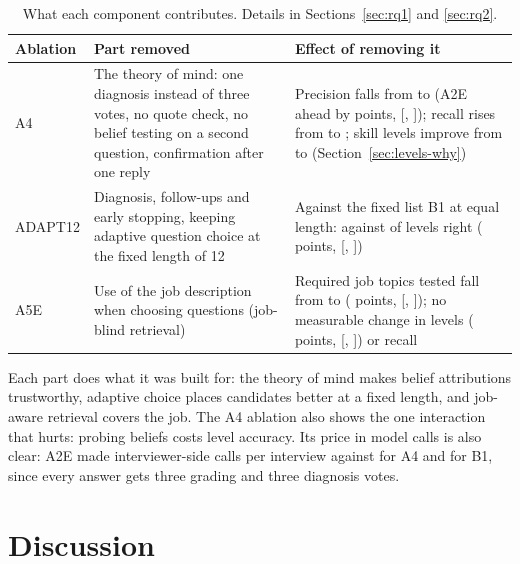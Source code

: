 \documentclass[10pt,a4paper]{article}
\newcommand{\ci}[2]{{\small[#1, #2]}}
\begin{document}
\begin{table}[h]
\centering\small
\begin{tabularx}{\linewidth}{@{}l X X@{}}
\toprule
Ablation & Part removed & Effect of removing it \\
\midrule
A4 & The theory of mind: one diagnosis instead of three votes, no quote check, no belief testing on
a second question, confirmation after one reply &
Precision falls from \fPrecisionFull{} to \fPrecisionAfour{} (A2E ahead by \fFullVsAfourPrecisionDiff{}
points, \ci{\fFullVsAfourPrecisionLow}{\fFullVsAfourPrecisionHigh}); recall rises from \fRecallFull{}
to \fRecallAfour{}; skill levels improve from \fAccFull{} to \fAccAfour{} (Section~\ref{sec:levels-why}) \\
ADAPT12 & Diagnosis, follow-ups and early stopping, keeping adaptive question choice at the fixed
length of 12 &
Against the fixed list B1 at equal length: \fAccAdapt{} against \fAccBOne{} of levels right
(\fAdaptVsFixedSkillAccuracyDiff{} points, \ci{\fAdaptVsFixedSkillAccuracyLow}{\fAdaptVsFixedSkillAccuracyHigh}) \\
A5E & Use of the job description when choosing questions (job-blind retrieval) &
Required job topics tested fall from \fCoverageFull{} to \fCoverageBlind{}
(\fBlindVsFullTopicCoverageDiff{} points, \ci{\fBlindVsFullTopicCoverageLow}{\fBlindVsFullTopicCoverageHigh}); no measurable change in
levels (\fBlindVsFullSkillAccuracyDiff{} points, \ci{\fBlindVsFullSkillAccuracyLow}{\fBlindVsFullSkillAccuracyHigh}) or recall \\
\bottomrule
\end{tabularx}
\caption{What each component contributes. Details in Sections~\ref{sec:rq1} and \ref{sec:rq2}.}
\label{tab:ablations}
\end{table}

\noindent Each part does what it was built for: the theory of mind makes belief attributions
trustworthy, adaptive choice places candidates better at a fixed length, and job-aware retrieval
covers the job. The A4 ablation also shows the one interaction that hurts: probing beliefs costs
level accuracy. Its price in model calls is also clear: A2E made \fCallsFull{} interviewer-side calls per
interview against \fCallsAfour{} for A4 and \fCallsBOne{} for B1, since every answer gets three grading
and three diagnosis votes.

\section{Discussion}
\end{document}
